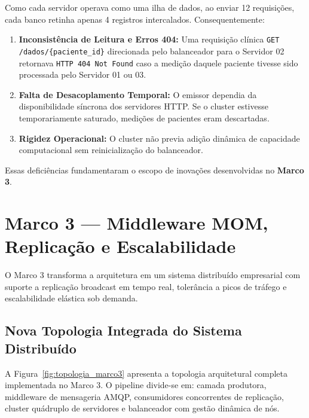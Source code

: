 \documentclass[12pt,a4paper]{article}
\begin{document}
	Como cada servidor operava como uma ilha de dados, ao enviar 12 requisições, cada banco retinha apenas 4 registros intercalados. Consequentemente:
	\begin{enumerate}
		\item \textbf{Inconsistência de Leitura e Erros 404:} Uma requisição clínica \texttt{GET /dados/\{paciente\_id\}} direcionada pelo balanceador para o Servidor 02 retornava \texttt{HTTP 404 Not Found} caso a medição daquele paciente tivesse sido processada pelo Servidor 01 ou 03.
		\item \textbf{Falta de Desacoplamento Temporal:} O emissor dependia da disponibilidade síncrona dos servidores HTTP. Se o cluster estivesse temporariamente saturado, medições de pacientes eram descartadas.
		\item \textbf{Rigidez Operacional:} O cluster não previa adição dinâmica de capacidade computacional sem reinicialização do balanceador.
	\end{enumerate}
	Essas deficiências fundamentaram o escopo de inovações desenvolvidas no \textbf{Marco 3}.
	
	\section{Marco 3 — Middleware MOM, Replicação e Escalabilidade}
	
	O Marco 3 transforma a arquitetura em um sistema distribuído empresarial com suporte a replicação broadcast em tempo real, tolerância a picos de tráfego e escalabilidade elástica sob demanda.
	
	\subsection{Nova Topologia Integrada do Sistema Distribuído}
	A Figura~\ref{fig:topologia_marco3} apresenta a topologia arquitetural completa implementada no Marco 3. O pipeline divide-se em: camada produtora, middleware de mensageria AMQP, consumidores concorrentes de replicação, cluster quádruplo de servidores e balanceador com gestão dinâmica de nós.
	
\end{document}
